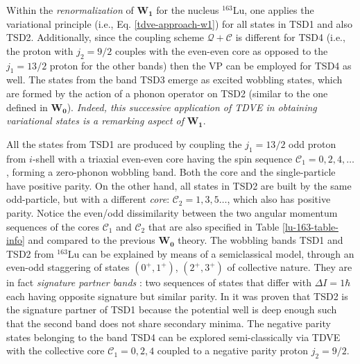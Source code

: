 Within the \emph{renormalization} of $\mathbf{W_1}$ for the nucleus $^{163}$Lu, one applies the variational principle (i.e., Eq. \ref{tdve-approach-w1}) for all states in TSD1 and also TSD2. Additionally, since the coupling scheme $\mathcal{Q}+\mathscr{C}$ is different for TSD4 (i.e., the proton with $j_2=9/2$ couples with the even-even core as opposed to the $j_1=13/2$ proton for the other bands) then the VP can be employed for TSD4 as well. The states from the band TSD3 emerge as excited wobbling states, which are formed by the action of a phonon operator on TSD2 (similar to the one defined in $\mathbf{W_0}$). \emph{Indeed, this successive application of TDVE in obtaining variational states is a remarking aspect of} $\mathbf{W_1}$.

All the states from TSD1 are produced by coupling the $j_1=13/2$ odd proton from $i$-shell with a triaxial even-even core having the spin sequence $\mathscr{C}_1=0,2,4,\dots$, forming a zero-phonon wobbling band. Both the core and the single-particle have positive parity. On the other hand, all states in TSD2 are built by the same odd-particle, but with a different \emph{core}: $\mathscr{C}_2=1,3,5\dots$, which also has positive parity. Notice the even/odd dissimilarity between the two angular momentum sequences of the cores $\mathscr{C}_1$ and $\mathscr{C}_2$ that are also specified in Table \ref{lu-163-table-info} and compared to the previous $\mathbf{W_0}$ theory. The wobbling bands TSD1 and TSD2 from $^{163}$Lu can be explained by means of a semiclassical model, through an even-odd staggering of states $(0^+,1^+)$, $(2^+,3^+)$ of collective nature. They are in fact \emph{signature partner bands} \cite{raduta2020approach}: two sequences of states that differ with $\Delta I=1\hbar$ each having opposite signature but similar parity. In \cite{raduta2020towards} it was proven that TSD2 is the signature partner of TSD1 because the potential well is deep enough such that the second band does not share secondary minima. The negative parity states belonging to the band TSD4 can be explored semi-classically via TDVE with the collective core $\mathscr{C}_1=0,2,4$ coupled to a negative parity proton $j_2=9/2$.

